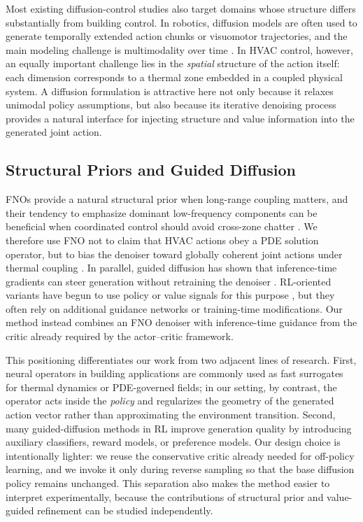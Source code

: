 \documentclass[lettersize,journal]{IEEEtran}
\theoremstyle{nonumberplain}     \theoremheaderfont{\bfseries\itshape}     \theorembodyfont{\normalfont}     \theoremseparator{:}     \theoremsymbol{\ensuremath{\blacksquare}}     \newtheorem{proof}{Proof}
\theoremstyle{plain}     \theoremheaderfont{\bfseries\itshape}     \theorembodyfont{\normalfont}     \theoremseparator{:}     \theoremsymbol{\ensuremath{\blacksquare}}     \newtheorem{remark}{Remark}
\begin{document}
Most existing diffusion-control studies also target domains whose structure differs substantially from building control. In robotics, diffusion models are often used to generate temporally extended action chunks or visuomotor trajectories, and the main modeling challenge is multimodality over time \cite{chi2025diffusion,janner2022planning}. In HVAC control, however, an equally important challenge lies in the \emph{spatial} structure of the action itself: each dimension corresponds to a thermal zone embedded in a coupled physical system. A diffusion formulation is attractive here not only because it relaxes unimodal policy assumptions, but also because its iterative denoising process provides a natural interface for injecting structure and value information into the generated joint action.

\subsection{Structural Priors and Guided Diffusion}
FNOs \cite{li2021fourier} provide a natural structural prior when long-range coupling matters, and their tendency to emphasize dominant low-frequency components can be beneficial when coordinated control should avoid cross-zone chatter \cite{qin2024toward,liu2024mitigating}. We therefore use FNO not to claim that HVAC actions obey a PDE solution operator, but to bias the denoiser toward globally coherent joint actions under thermal coupling \cite{goyal2012method,wen2022u}. In parallel, guided diffusion has shown that inference-time gradients can steer generation without retraining the denoiser \cite{dhariwal2021diffusion,ho2021classifier}. RL-oriented variants have begun to use policy or value signals for this purpose \cite{jackson2024policy,fang2025diffusion}, but they often rely on additional guidance networks or training-time modifications. Our method instead combines an FNO denoiser with inference-time guidance from the critic already required by the actor--critic framework.

This positioning differentiates our work from two adjacent lines of research. First, neural operators in building applications are commonly used as fast surrogates for thermal dynamics or PDE-governed fields; in our setting, by contrast, the operator acts inside the \emph{policy} and regularizes the geometry of the generated action vector rather than approximating the environment transition. Second, many guided-diffusion methods in RL improve generation quality by introducing auxiliary classifiers, reward models, or preference models. Our design choice is intentionally lighter: we reuse the conservative critic already needed for off-policy learning, and we invoke it only during reverse sampling so that the base diffusion policy remains unchanged. This separation also makes the method easier to interpret experimentally, because the contributions of structural prior and value-guided refinement can be studied independently.
\end{document}
